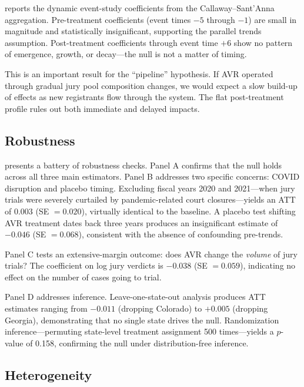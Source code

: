 \documentclass[12pt]{article}
\begin{document}


 reports the dynamic event-study coefficients from the Callaway--Sant'Anna aggregation. Pre-treatment coefficients (event times $-5$ through $-1$) are small in magnitude and statistically insignificant, supporting the parallel trends assumption. Post-treatment coefficients through event time $+6$ show no pattern of emergence, growth, or decay---the null is not a matter of timing.

This is an important result for the ``pipeline'' hypothesis. If AVR operated through gradual jury pool composition changes, we would expect a slow build-up of effects as new registrants flow through the system. The flat post-treatment profile rules out both immediate and delayed impacts.

\subsection{Robustness}



 presents a battery of robustness checks. Panel A confirms that the null holds across all three main estimators. Panel B addresses two specific concerns: COVID disruption and placebo timing. Excluding fiscal years 2020 and 2021---when jury trials were severely curtailed by pandemic-related court closures---yields an ATT of $0.003$ (SE $= 0.020$), virtually identical to the baseline. A placebo test shifting AVR treatment dates back three years produces an insignificant estimate of $-0.046$ (SE $= 0.068$), consistent with the absence of confounding pre-trends.

Panel C tests an extensive-margin outcome: does AVR change the \textit{volume} of jury trials? The coefficient on log jury verdicts is $-0.038$ (SE $= 0.059$), indicating no effect on the number of cases going to trial.

Panel D addresses inference. Leave-one-state-out analysis produces ATT estimates ranging from $-0.011$ (dropping Colorado) to $+0.005$ (dropping Georgia), demonstrating that no single state drives the null. Randomization inference---permuting state-level treatment assignment 500 times---yields a $p$-value of 0.158, confirming the null under distribution-free inference.

\subsection{Heterogeneity}
\end{document}
